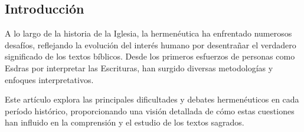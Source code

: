 \begin{multicols}{2}
\tableofcontents

\section{Introducción}

A lo largo de la historia de la Iglesia, la hermenéutica ha enfrentado numerosos desafíos, reflejando la evolución del interés humano por desentrañar el verdadero significado de los textos bíblicos. Desde los primeros esfuerzos de personas como Esdras por interpretar las Escrituras, han surgido diversas metodologías y enfoques interpretativos.

Este artículo explora las principales dificultades y debates hermenéuticos en cada período histórico, proporcionando una visión detallada de cómo estas cuestiones han influido en la comprensión y el estudio de los textos sagrados.

\end{multicols}
